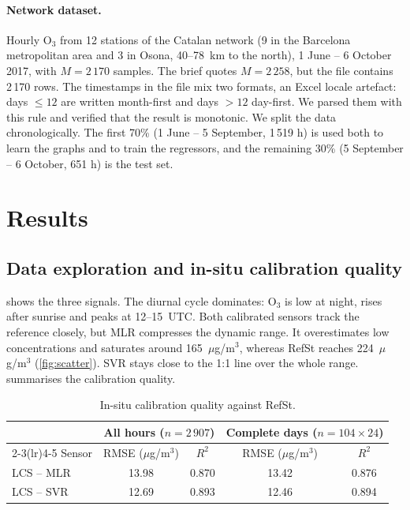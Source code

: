 \documentclass[11pt,a4paper]{article}
\newcommand{\Othree}{O$_3$}
\newcommand{\ugm}{$\mu$g/m$^3$}
\begin{document}
\paragraph{Network dataset.} Hourly \Othree{} from 12 stations of the Catalan network (9 in the Barcelona metropolitan area and 3 in Osona, 40--78~km to the north), 1 June -- 6 October 2017, with $M=2\,170$ samples. The brief quotes $M=2\,258$, but the file contains 2\,170 rows. The timestamps in the file mix two formats, an Excel locale artefact: days $\le12$ are written month-first and days $>12$ day-first. We parsed them with this rule and verified that the result is monotonic. We split the data chronologically. The first 70\% (1 June -- 5 September, 1\,519 h) is used both to learn the graphs and to train the regressors, and the remaining 30\% (5 September -- 6 October, 651 h) is the test set.

\section{Results}\label{sec:results}
\subsection{Data exploration and in-situ calibration quality}
 shows the three signals. The diurnal cycle dominates: \Othree{} is low at night, rises after sunrise and peaks at 12--15~UTC. Both calibrated sensors track the reference closely, but MLR compresses the dynamic range. It overestimates low concentrations and saturates around 165~\ugm{}, whereas RefSt reaches 224~\ugm{} (\cref{fig:scatter}). SVR stays close to the 1:1 line over the whole range.  summarises the calibration quality.

\begin{table}[h]
\centering
\caption{In-situ calibration quality against RefSt.}\label{tab:calib}
\begin{tabular}{lcccc}
\toprule
 & \multicolumn{2}{c}{All hours ($n=2\,907$)} & \multicolumn{2}{c}{Complete days ($n=104\times24$)}\\
\cmidrule(lr){2-3}\cmidrule(lr){4-5}
Sensor & RMSE (\ugm) & $R^2$ & RMSE (\ugm) & $R^2$\\
\midrule
LCS -- MLR & 13.98 & 0.870 & 13.42 & 0.876\\
LCS -- SVR & 12.69 & 0.893 & 12.46 & 0.894\\
\bottomrule
\end{tabular}
\end{table}
\end{document}

